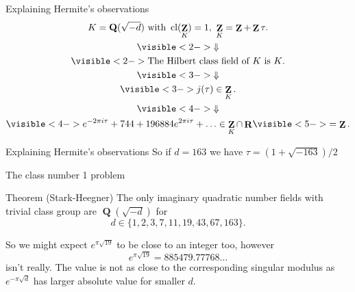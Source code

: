 \documentclass{beamer}
\DeclareMathOperator{\cl}{cl}
\DeclareMathOperator{\ZZ}{\mathbf{Z}}
\DeclareMathOperator{\QQ}{\mathbf{Q}}
\DeclareMathOperator{\RR}{\mathbf{R}}
\begin{document}
\begin{frame}{Explaining Hermite's observations}
\begin{gather*}
K = \QQ(\sqrt{-d}) \text{ with } \cl(\ZZ_K) = 1,\ \ZZ_K = \ZZ+\ZZ\tau.\\
\visible<2->{\Downarrow}\\
\visible<2->{\text{The Hilbert class field of $K$ is $K$}.}\\
\visible<3->{\Downarrow}\\
\visible<3->{j(\tau)\in \ZZ_K.}\\
\visible<4->{\Downarrow}\\
\visible<4->{e^{-2\pi i \tau} + 744 + 196884 e^{2\pi i \tau} + \ldots\in \ZZ_K\cap \RR}\visible<5->{ = \ZZ.}
\end{gather*}
\end{frame}

\begin{frame}{Explaining Hermite's observations}
So if $d= 163$ we have $\tau = (1 + \sqrt{-163})/2$

\end{frame}

\begin{frame}{The class number 1 problem}
\begin{block}{Theorem (Stark-Heegner)}
The only imaginary quadratic number fields with trivial class group are $\QQ(\sqrt{-d})$ for
\[d\in\{1,2,3,7,11,19,43,67,163\}.\]
\end{block}
\pause
So we might expect $e^{\pi\sqrt{19}}$ to be close to an integer too, however
\[
e^{\pi\sqrt{19}} = 885479.77768\ldots
\]
isn't really.
\pause The value is not as close to the corresponding singular modulus as $e^{-\pi\sqrt{d}}$ has larger absolute value for smaller $d$.
\end{frame}
\end{document}
